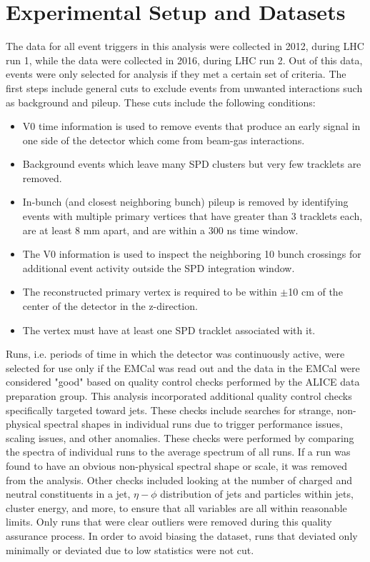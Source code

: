 \section{Experimental Setup and Datasets} 
\label{ch:SetupAndDatasets}

The \pp data for all event triggers in this analysis were collected in 2012, during LHC run 1, while the \pPb data were collected in 2016, during LHC run 2. Out of this data, events were only selected for analysis if they met a certain set of criteria. The first steps include general cuts to exclude events from unwanted interactions such as background and pileup. These cuts include the following conditions:

\begin{itemize}
    \item V0 time information is used to remove events that produce an early signal in one side of the detector which come from beam-gas interactions.
    \item Background events which leave many SPD clusters but very few tracklets are removed. 
    \item In-bunch (and closest neighboring bunch) pileup is removed by identifying events with multiple primary vertices that have greater than 3 tracklets each, are at least 8 mm apart, and are within a 300 ns time window.
    \item The V0 information is used to inspect the neighboring 10 bunch crossings for additional event activity outside the SPD integration window.
    \item The reconstructed primary vertex is required to be within $\pm$10 cm of the center of the detector in the z-direction.
    \item The vertex must have at least one SPD tracklet associated with it.
\end{itemize}

Runs, i.e. periods of time in which the detector was continuously active, were selected for use only if the EMCal was read out and the data in the EMCal were considered "good" based on quality control checks performed by the ALICE data preparation group. This analysis incorporated additional quality control checks specifically targeted toward jets. These checks include searches for strange, non-physical spectral shapes in individual runs due to trigger performance issues, scaling issues, and other anomalies. These checks were performed by comparing the spectra of individual runs to the average spectrum of all runs. If a run was found to have an obvious non-physical spectral shape or scale, it was removed from the analysis. Other checks included looking at the number of charged and neutral constituents in a jet, $\eta-\phi$ distribution of jets and particles within jets, cluster energy, and more, to ensure that all variables are all within reasonable limits. Only runs that were clear outliers were removed during this quality assurance process. In order to avoid biasing the dataset, runs that deviated only minimally or deviated due to low statistics were not cut. 

